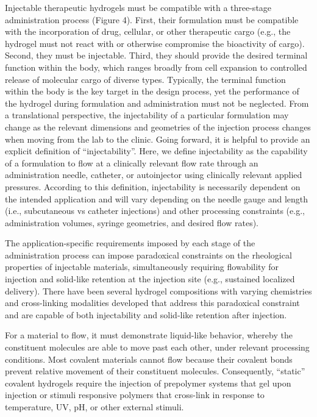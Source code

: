 \documentclass[../../main-notes.tex]{subfiles}
\begin{document}
Injectable therapeutic hydrogels must be compatible with a three-stage administration process (Figure 4).  
First, their formulation must be compatible with the incorporation of drug, cellular, or other therapeutic cargo (e.g., the hydrogel must not react with or otherwise compromise the bioactivity of cargo).  
Second, they must be injectable.  
Third, they should provide the desired terminal function within the body, which ranges broadly from cell expansion to controlled release of molecular cargo of diverse types.  
Typically, the terminal function within the body is the key target in the design process, yet the performance of the hydrogel during formulation and administration must not be neglected.  
From a translational perspective, the injectability of a particular formulation may change as the relevant dimensions and geometries of the injection process changes when moving from the lab to the clinic.  
Going forward, it is helpful to provide an explicit definition of “injectability”.   
Here, we define injectability as the capability of a formulation to flow at a clinically relevant flow rate through an administration needle, catheter, or autoinjector using clinically relevant applied pressures.  
According to this definition, injectability is necessarily dependent on the intended application and will vary depending on the needle gauge and length (i.e., subcutaneous vs catheter injections) and other processing constraints (e.g., administration volumes, syringe geometries, and desired flow rates).   

The application-specific requirements imposed by each stage of the administration process can impose paradoxical constraints on the rheological properties of injectable materials, simultaneously requiring flowability for injection and solid-like retention at the injection site (e.g., sustained localized delivery). 
There have been several hydrogel compositions with varying chemistries and cross-linking modalities developed that address this paradoxical constraint and are capable of both injectability and solid-like retention after injection. 

For a material to flow, it must demonstrate liquid-like behavior, whereby the constituent molecules are able to move past each other, under relevant processing conditions. 
Most covalent materials cannot flow because their covalent bonds prevent relative movement of their constituent molecules. 
Consequently, “static” covalent hydrogels require the injection of prepolymer systems that gel upon injection or stimuli responsive polymers that cross-link in response to temperature, UV, pH, or other external stimuli. 
\end{document}
